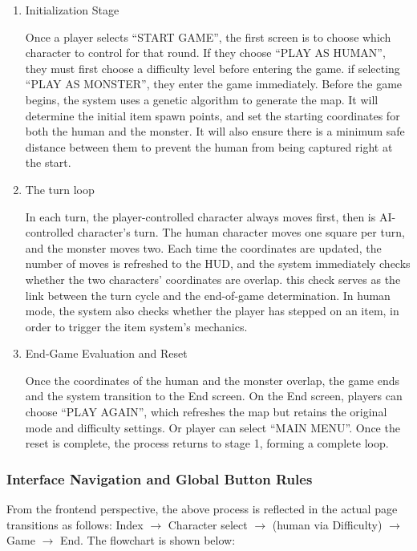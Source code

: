 \documentclass[12pt,a4paper]{article}
\begin{document}
\begin{enumerate}
\item Initialization Stage

Once a player selects ``START GAME'', the first screen is to choose which character to control for that round. If they choose ``PLAY AS HUMAN'', they must first choose a difficulty level before entering the game. if selecting ``PLAY AS MONSTER'', they enter the game immediately. Before the game begins, the system uses a genetic algorithm to generate the map. It will determine the initial item spawn points, and set the starting coordinates for both the human and the monster. It will also ensure there is a minimum safe distance between them to prevent the human from being captured right at the start.

\item The turn loop

In each turn, the player-controlled character always moves first, then is AI-controlled character's turn. The human character moves one square per turn, and the monster moves two. Each time the coordinates are updated, the number of moves is refreshed to the HUD, and the system immediately checks whether the two characters' coordinates are overlap. this check serves as the link between the turn cycle and the end-of-game determination. In human mode, the system also checks whether the player has stepped on an item, in order to trigger the item system's mechanics.

\item End-Game Evaluation and Reset

Once the coordinates of the human and the monster overlap, the game ends and the system transition to the End screen. On the End screen, players can choose ``PLAY AGAIN'', which refreshes the map but retains the original mode and difficulty settings. Or player can select ``MAIN MENU''. Once the reset is complete, the process returns to stage 1, forming a complete loop.
\end{enumerate}

\subsubsection{Interface Navigation and Global Button Rules}

From the frontend perspective, the above process is reflected in the actual page transitions as follows: Index $\rightarrow$ Character select $\rightarrow$ (human via Difficulty) $\rightarrow$ Game $\rightarrow$ End. The flowchart is shown below:
\end{document}
